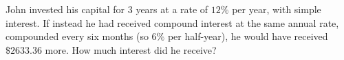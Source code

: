 John invested his capital for $3$ years at a rate of $12\%$ per year, with simple interest. If instead he had received compound interest at the same annual rate, compounded every six months (so $6\%$ per half-year), he would have received $\$2633.36$ more. How much interest did he receive?
